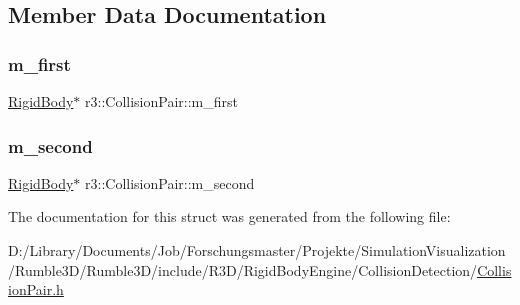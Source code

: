 \subsection{Member Data Documentation}
\mbox{\label{structr3_1_1_collision_pair_a6c2fbf8e05b333a4e93f6ac75049d429}} 
\subsubsection{\texorpdfstring{m\+\_\+first}{m\_first}}
{\footnotesize\ttfamily \mbox{\hyperlink{classr3_1_1_rigid_body}{Rigid\+Body}}$\ast$ r3\+::\+Collision\+Pair\+::m\+\_\+first}

\mbox{\label{structr3_1_1_collision_pair_ad7ff97123502a1e0535d3f5da8013411}} 
\subsubsection{\texorpdfstring{m\+\_\+second}{m\_second}}
{\footnotesize\ttfamily \mbox{\hyperlink{classr3_1_1_rigid_body}{Rigid\+Body}}$\ast$ r3\+::\+Collision\+Pair\+::m\+\_\+second}



The documentation for this struct was generated from the following file\+:\begin{DoxyCompactItemize}
\item 
D\+:/\+Library/\+Documents/\+Job/\+Forschungsmaster/\+Projekte/\+Simulation\+Visualization/\+Rumble3\+D/\+Rumble3\+D/include/\+R3\+D/\+Rigid\+Body\+Engine/\+Collision\+Detection/\mbox{\hyperlink{_collision_pair_8h}{Collision\+Pair.\+h}}\end{DoxyCompactItemize}
